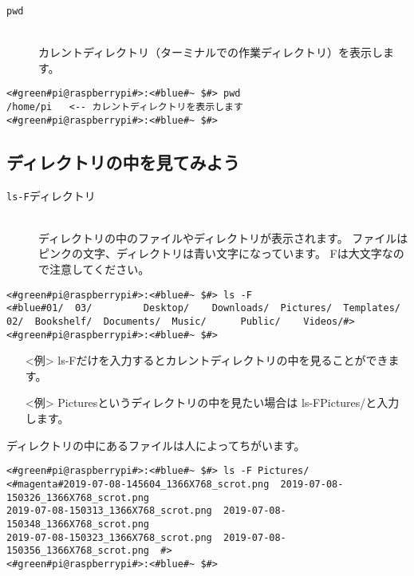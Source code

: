 \begin{description}
\item[\texttt{pwd}]\mbox{}\\
 カレントディレクトリ（ターミナルでの作業ディレクトリ）を表示します。
\end{description}

\begin{lstlisting}[caption=pwdコマンドの例,label=pwdtest]
<#green#pi@raspberrypi#>:<#blue#~ $#> pwd
/home/pi   <-- カレントディレクトリを表示します
<#green#pi@raspberrypi#>:<#blue#~ $#>
\end{lstlisting}

\subsection{ディレクトリの中を見てみよう}
\begin{description}
\item[\texttt{ls}\textvisiblespace \texttt{-F}\textvisiblespace ディレクトリ]\mbox{}\\
ディレクトリの中のファイルやディレクトリが表示されます。
ファイルはピンクの文字、ディレクトリは青い文字になっています。
Fは大文字なので注意してください。
\end{description}

\begin{minipage}{\linewidth}
\begin{lstlisting}[caption=ls -F コマンドの例。ファイルやディレクトリが表示されます,label=lsFtest]
<#green#pi@raspberrypi#>:<#blue#~ $#> ls -F
<#blue#01/  03/         Desktop/    Downloads/  Pictures/  Templates/
02/  Bookshelf/  Documents/  Music/      Public/    Videos/#>
<#green#pi@raspberrypi#>:<#blue#~ $#>
\end{lstlisting}
\end{minipage}

\begin{itemize}
\item[<例>] ls\textvisiblespace -Fだけを入力するとカレントディレクトリの中を見ることができます。 
\item[<例>] Picturesというディレクトリの中を見たい場合は ls\textvisiblespace -F\textvisiblespace Pictures/と入力します。 
\end{itemize}

ディレクトリの中にあるファイルは人によってちがいます。
\begin{lstlisting}[caption=ls -F Pictures/コマンドの例,label=lsFPicttest]
<#green#pi@raspberrypi#>:<#blue#~ $#> ls -F Pictures/
<#magenta#2019-07-08-145604_1366X768_scrot.png  2019-07-08-150326_1366X768_scrot.png  
2019-07-08-150313_1366X768_scrot.png  2019-07-08-150348_1366X768_scrot.png  
2019-07-08-150323_1366X768_scrot.png  2019-07-08-150356_1366X768_scrot.png  #>
<#green#pi@raspberrypi#>:<#blue#~ $#> 
\end{lstlisting}

